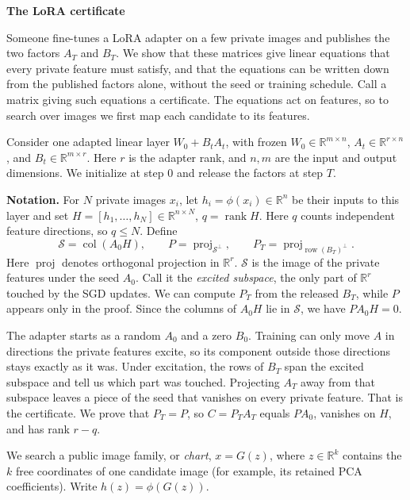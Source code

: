 \documentclass[11pt,a4paper]{article}
\newcommand{\block}[1]{\par\vspace{5pt}{\color{ink}\bfseries #1}\par\vspace{2pt}}
\newcommand{\rank}{\operatorname{rank}}
\newcommand{\col}{\operatorname{col}}
\newcommand{\row}{\operatorname{row}}
\newcommand{\proj}{\operatorname{proj}}
\newcommand{\Sdata}{\mathcal S}
\begin{document}
{\LARGE\bfseries\color{ink}The LoRA certificate}\par
\vspace{4pt}

\block{1. What we want}
Someone fine-tunes a LoRA adapter on a few private images and publishes the two
factors \(A_T\) and \(B_T\). We show that these matrices give linear equations
that every private feature must satisfy, and that the equations can be written
down from the published factors alone, without the seed or training schedule.
Call a matrix giving such equations a certificate. The equations act on features,
so to search over images we first map each candidate to its features.

Consider one adapted linear layer \(W_0+B_tA_t\), with frozen
\(W_0\in\mathbb R^{m\times n}\), \(A_t\in\mathbb R^{r\times n}\), and
\(B_t\in\mathbb R^{m\times r}\). Here \(r\) is the adapter rank, and \(n,m\)
are the input and output dimensions. We initialize at step \(0\) and release
the factors at step \(T\).

\textbf{Notation.} For \(N\) private images \(x_i\), let
\(h_i=\phi(x_i)\in\mathbb R^n\) be their inputs to this layer and set
\(H=[h_1,\ldots,h_N]\in\mathbb R^{n\times N}\), \(q=\rank H\).
Here \(q\) counts independent feature directions, so \(q\le N\). Define
\[
\Sdata=\col(A_0H),\qquad P=\proj_{\Sdata^\perp},\qquad
P_T=\proj_{\row(B_T)^\perp}.
\]
Here \(\proj\) denotes orthogonal projection in \(\mathbb R^r\).
\(\Sdata\) is the image of the private features under the seed \(A_0\). Call it the
\emph{excited subspace}, the only part of \(\mathbb R^r\) touched by the SGD updates.
We can compute \(P_T\) from the released \(B_T\), while \(P\) appears only in the
proof. Since the columns of \(A_0H\) lie in \(\Sdata\), we have \(PA_0H=0\).

The adapter starts as a random \(A_0\) and a zero \(B_0\). Training can only move
\(A\) in directions the private features excite, so its component outside those
directions stays exactly as it was. Under excitation, the rows of \(B_T\) span
the excited subspace and tell us which part was touched. Projecting \(A_T\) away
from that subspace leaves a piece of the seed that vanishes on every private
feature. That is the certificate. We prove that \(P_T=P\), so \(C=P_TA_T\)
equals \(PA_0\), vanishes on \(H\), and has rank \(r-q\).

\block{2. How it is used}
We search a public image family, or \emph{chart}, \(x=G(z)\), where
\(z\in\mathbb R^k\) contains the \(k\) free coordinates of one candidate image
(for example, its retained PCA coefficients). Write \(h(z)=\phi(G(z))\).
\end{document}
